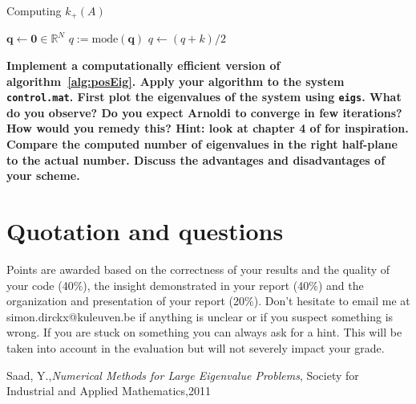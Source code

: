 \documentclass[12pt]{article}
\begin{document}
\begin{algorithm2e}\label{alg:posEig}
  \SetAlgoLined
  \caption{Computing $k_{+}(A)$}
  $\mathbf{q} \gets \mathbf{0}\in\mathbb{R}^{N}$\;
  $q := \text{mode}(\mathbf{q}) $\;
  $q\gets (q+k)/2$
\end{algorithm2e}
\textbf{Implement a computationally efficient version of algorithm~\ref{alg:posEig}. Apply your algorithm to the system \texttt{control.mat}. First plot the eigenvalues of the system using \texttt{eigs}. What do you observe? Do you expect Arnoldi to converge in few iterations? How would you remedy this? Hint: look at chapter 4 of \cite{Saad} for inspiration. Compare the computed number of eigenvalues in the right half-plane to the actual number. Discuss the advantages and disadvantages of your scheme.}
\section{Quotation and questions}
Points are awarded based on the correctness of your results and the quality of your code (40$\%$),
the insight demonstrated in your report (40$\%$) and the organization and presentation of your report
(20$\%$). Don’t hesitate to email me at simon.dirckx@kuleuven.be if anything is unclear or if you suspect
something is wrong. If you are stuck on something you can always ask for a hint. This will be taken
into account in the evaluation but will not severely impact your grade.


\begin{thebibliography}{100}
 Saad, Y.,\emph{Numerical Methods for Large Eigenvalue Problems}, Society for Industrial and Applied Mathematics,2011
\end{thebibliography}
\end{document}
